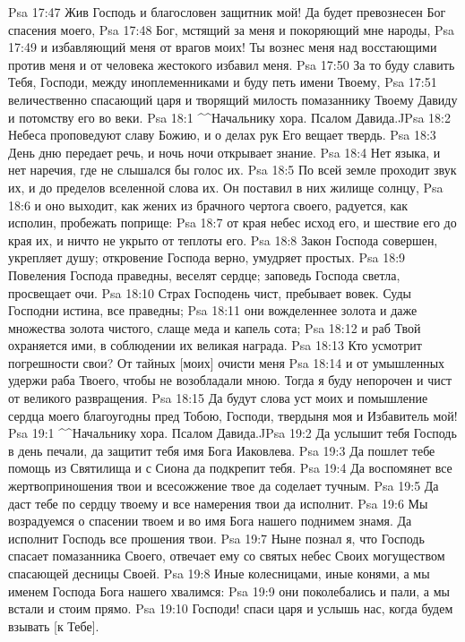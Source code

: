 Psa 17:47  Жив Господь и благословен защитник мой! Да будет превознесен Бог спасения моего,
Psa 17:48  Бог, мстящий за меня и покоряющий мне народы,
Psa 17:49  и избавляющий меня от врагов моих! Ты вознес меня над восстающими против меня и от человека жестокого избавил меня.
Psa 17:50  За то буду славить Тебя, Господи, между иноплеменниками и буду петь имени Твоему,
Psa 17:51  величественно спасающий царя и творящий милость помазаннику Твоему Давиду и потомству его во веки.
Psa 18:1  ^^Начальнику хора. Псалом Давида.^^
Psa 18:2  Небеса проповедуют славу Божию, и о делах рук Его вещает твердь.
Psa 18:3  День дню передает речь, и ночь ночи открывает знание.
Psa 18:4  Нет языка, и нет наречия, где не слышался бы голос их.
Psa 18:5  По всей земле проходит звук их, и до пределов вселенной слова их. Он поставил в них жилище солнцу,
Psa 18:6  и оно выходит, как жених из брачного чертога своего, радуется, как исполин, пробежать поприще:
Psa 18:7  от края небес исход его, и шествие его до края их, и ничто не укрыто от теплоты его.
Psa 18:8  Закон Господа совершен, укрепляет душу; откровение Господа верно, умудряет простых.
Psa 18:9  Повеления Господа праведны, веселят сердце; заповедь Господа светла, просвещает очи.
Psa 18:10  Страх Господень чист, пребывает вовек. Суды Господни истина, все праведны;
Psa 18:11  они вожделеннее золота и даже множества золота чистого, слаще меда и капель сота;
Psa 18:12  и раб Твой охраняется ими, в соблюдении их великая награда.
Psa 18:13  Кто усмотрит погрешности свои? От тайных [моих] очисти меня
Psa 18:14  и от умышленных удержи раба Твоего, чтобы не возобладали мною. Тогда я буду непорочен и чист от великого развращения.
Psa 18:15  Да будут слова уст моих и помышление сердца моего благоугодны пред Тобою, Господи, твердыня моя и Избавитель мой!
Psa 19:1  ^^Начальнику хора. Псалом Давида.^^
Psa 19:2  Да услышит тебя Господь в день печали, да защитит тебя имя Бога Иаковлева.
Psa 19:3  Да пошлет тебе помощь из Святилища и с Сиона да подкрепит тебя.
Psa 19:4  Да воспомянет все жертвоприношения твои и всесожжение твое да соделает тучным.
Psa 19:5  Да даст тебе по сердцу твоему и все намерения твои да исполнит.
Psa 19:6  Мы возрадуемся о спасении твоем и во имя Бога нашего поднимем знамя. Да исполнит Господь все прошения твои.
Psa 19:7  Ныне познал я, что Господь спасает помазанника Своего, отвечает ему со святых небес Своих могуществом спасающей десницы Своей.
Psa 19:8  Иные колесницами, иные конями, а мы именем Господа Бога нашего хвалимся:
Psa 19:9  они поколебались и пали, а мы встали и стоим прямо.
Psa 19:10  Господи! спаси царя и услышь нас, когда будем взывать [к Тебе].
